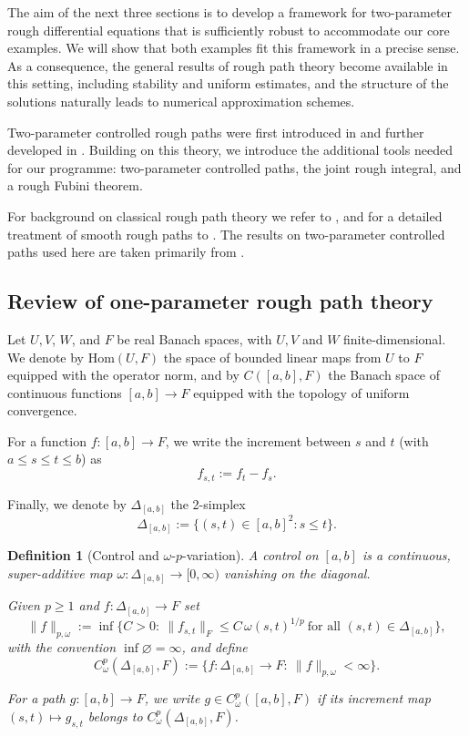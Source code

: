 \documentclass{article}%
\newtheorem{definition}[theorem]{Definition}
\begin{document}
The aim of the next three sections is to develop a framework for two-parameter rough differential equations that is sufficiently robust to accommodate our core examples. We will show that both examples fit this framework in a precise sense. As a consequence, the general results of rough path theory become available in this setting, including stability and uniform estimates, and the structure of the solutions naturally leads to numerical approximation schemes.

Two-parameter controlled rough paths were first introduced in \cite{gerasimovivcs2019hormander} and further developed in \cite{cass2023fubini}. Building on this theory, we introduce the additional tools needed for our programme: two-parameter controlled paths, the joint rough integral, and a rough Fubini theorem.

For background on classical rough path theory we refer to \cite{cass2022combinatorial, friz2014course}, and for a detailed treatment of smooth rough paths to \cite{bellingeri2022smooth}. The results on two-parameter controlled paths used here are taken primarily from \cite{cass2023fubini}.

\subsection{Review of one-parameter rough path theory}
Let $U, V$, $W$, and $F$ be real Banach spaces, with $U, V$ and $W$ finite-dimensional.  
We denote by $\mathrm{Hom}(U,F)$ the space of bounded linear maps from $U$ to $F$ equipped with the operator norm, and by $C([a,b],F)$ the Banach space of continuous functions $[a,b] \to F$ equipped with the topology of uniform convergence.  

For a function $f:[a,b]\to F$, we write the increment between $s$ and $t$ (with $a \le s \le t \le b$) as
\[
f_{s,t} := f_t - f_s.
\]

Finally, we denote by $\Delta_{[a,b]}$ the 2-simplex
\[
\Delta_{[a,b]} := \{ (s,t) \in [a,b]^2 : s \le t \}.
\]

\begin{definition}[Control and $\omega$-$p$-variation]
A control on $[a,b]$ is a continuous, super-additive map
$\omega:\Delta_{[a,b]}\to[0,\infty)$ vanishing on the diagonal.

Given $p\ge 1$ and $f:\Delta_{[a,b]}\to F$ set
\[
\|f\|_{p,\omega}
:=
\inf\Big\{C>0:\ \|f_{s,t}\|_F\le C\,\omega(s,t)^{1/p}
\ \text{for all }(s,t)\in\Delta_{[a,b]}\Big\},
\]
with the convention $\inf\varnothing=\infty$, and define
\[
C_\omega^p(\Delta_{[a,b]},F)
:=
\{f:\Delta_{[a,b]}\to F:\ \|f\|_{p,\omega}<\infty\}.
\]

For a path $g:[a,b]\to F$, we write $g\in C_\omega^p([a,b],F)$ if its increment map
\(
(s,t)\mapsto g_{s,t}
\)
belongs to $C_\omega^p(\Delta_{[a,b]},F)$.
\end{definition}
\end{document}
